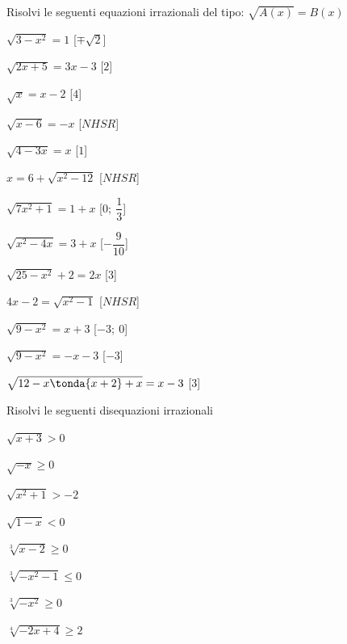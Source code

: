 \begin{esercizio}\label{ese:03.1}
Risolvi le seguenti equazioni irrazionali del tipo:
\(\sqrt{A(x)} = B(x)\)
\begin{multicols}{2}
\begin{enumeratea}
\item \(\sqrt{3 -x^2} = 1\) \hfill [\(\mp \sqrt{2}\)]
\item \(\sqrt{2x +5} = 3x -3\) \hfill [\(2\)]
\item \(\sqrt{x} = x-2\) \hfill [\(4\)]
\item \(\sqrt{x -6} = -x\) \hfill [\(NHSR\)]
\item \(\sqrt{4 -3x} = x\) \hfill [\(1\)]
\item \(x = 6 +\sqrt{x^2 -12}\) \hfill [\(NHSR\)]
\item \(\sqrt{7x^2 +1} = 1 +x\) \hfill [\(0;~\dfrac{1}{3}\)]
\item \(\sqrt{x^2 -4x} = 3 +x\) \hfill [\(-\dfrac{9}{10}\)]
\item \(\sqrt{25 -x^2} +2 = 2x\) \hfill [\(3\)]
\item \(4x -2 = \sqrt{x^2 -1}\) \hfill [\(NHSR\)]
\item \(\sqrt{9 -x^2} = x +3\) \hfill [\(-3;~0\)]
\item \(\sqrt{9 -x^2} = -x -3\) \hfill [\(-3\)]
\item \(\sqrt{12 -x\tonda{x +2} +x} = x -3\) \hfill [\(3\)]
\end{enumeratea}
\end{multicols}
\end{esercizio}

\begin{esercizio}\label{ese:03.1}
Risolvi le seguenti disequazioni irrazionali
\begin{multicols}{2}
\begin{enumeratea}
\item \(\sqrt{x+3} > 0\)
\item \(\sqrt{-x} \geq 0 \)
\item \(\sqrt{x^2 +1} > -2 \)
\item \(\sqrt{1 -x} < 0\)
\item \(\sqrt[3]{x-2} \geq 0\)
\item \(\sqrt[3]{-x^2-1} \leq 0\)
\item \(\sqrt[3]{-x^2} \geq 0\)
\item \(\sqrt[4]{-2x +4} \geq 2\)
\end{enumeratea}
\end{multicols}
\end{esercizio}

